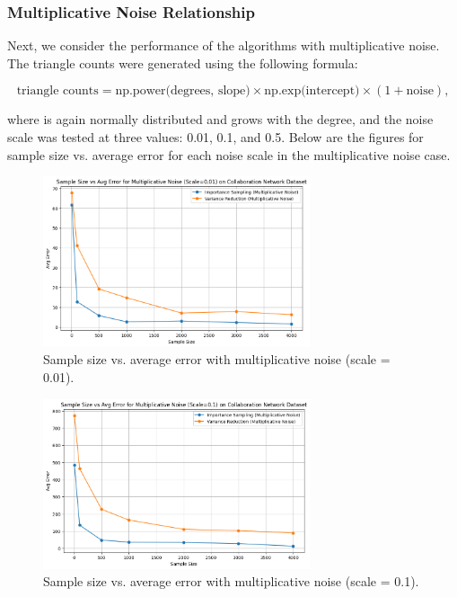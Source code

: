 \documentclass[11pt]{article}
\begin{document}
\subsubsection{Multiplicative Noise Relationship}

Next, we consider the performance of the algorithms with multiplicative noise. The triangle counts were generated using the following formula:

\[
\text{triangle counts} = \text{np.power(degrees, slope)} \times \text{np.exp(intercept)} \times (1 + \text{noise}),
\]

where  is again normally distributed and grows with the degree, and the noise scale was tested at three values: 0.01, 0.1, and 0.5. Below are the figures for sample size vs. average error for each noise scale in the multiplicative noise case.

\begin{figure}[H]
    \centering
    \includegraphics[width=0.7\textwidth]{plots/simulated/percent_error_vs_sample_size_comparison_multiplicative_0.01.png}
    \caption{Sample size vs. average error with multiplicative noise (scale = 0.01).}
    \label{fig:multiplicative_noise_001}
\end{figure}

\begin{figure}[H]
    \centering
    \includegraphics[width=0.7\textwidth]{plots/simulated/percent_error_vs_sample_size_comparison_multiplicative_0.1.png}
    \caption{Sample size vs. average error with multiplicative noise (scale = 0.1).}
    \label{fig:multiplicative_noise_01}
\end{figure}
\end{document}
